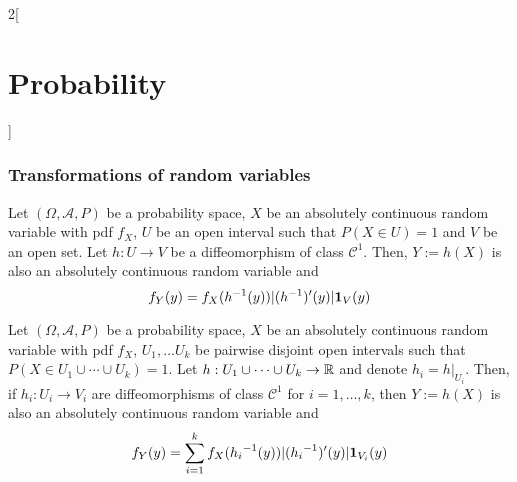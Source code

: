 \documentclass[../../../main.tex]{subfiles}
\begin{document}
\begin{multicols}{2}[\section{Probability}]
  \subsubsection{Transformations of random variables}
  \begin{prop}
    Let $(\Omega,\mathcal{A},P)$ be a probability space, $X$ be an absolutely continuous random variable with pdf $f_X$, $U$ be an open interval such that $P(X\in U)=1$ and $V$ be an open set. Let $h:U\rightarrow V$ be a diffeomorphism of class $\mathcal{C}^1$. Then, $Y:=h(X)$ is also an absolutely continuous random variable and $$f_Y(y)=f_X(h^{-1}(y))|(h^{-1})'(y)|\boldsymbol{\mathrm{1}}_V(y)$$
  \end{prop}
  \begin{prop}
    Let $(\Omega,\mathcal{A},P)$ be a probability space, $X$ be an absolutely continuous random variable with pdf $f_X$, $U_1,\ldots U_k$ be pairwise disjoint open intervals such that $P(X\in U_1\cup \cdots\cup U_k)=1$. Let $h:U_1\cup \cdots\cup U_k\rightarrow \mathbb{R}$ and denote $h_i=h|_{U_i}$. Then, if $h_i:U_i\rightarrow V_i$ are  diffeomorphisms of class $\mathcal{C}^1$ for $i=1,\ldots,k$, then $Y:=h(X)$ is also an absolutely continuous random variable and $$f_Y(y)=\sum_{i=1}^kf_X({h_i}^{-1}(y))|({h_i}^{-1})'(y)|\boldsymbol{\mathrm{1}}_{V_i}(y)$$
  \end{prop}

\end{multicols}
\end{document}
